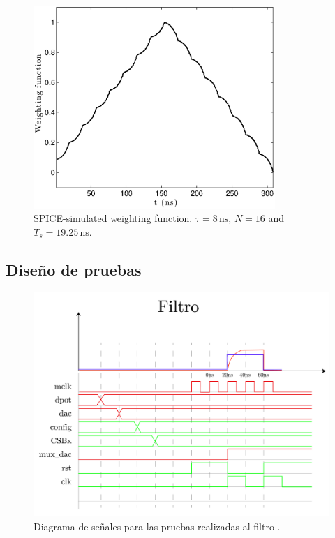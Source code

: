 \begin{figure}[!t]
	\centering
	\includegraphics[width=3.6in]{./figures/theorical/sim_wf}
	\caption{SPICE-simulated weighting function. $\tau=8\,\text{ns}$, $N=16$ and $T_s=19.25\,\text{ns}$.}\label{fig:sim_wf}
\end{figure}

\subsection{Diseño de pruebas}

\begin{figure}[!t]
	\centering
	\includegraphics[width=1\textwidth]{./figures/theorical/tiempos_filtro.png}
	\caption{Diagrama de señales para las pruebas realizadas al filtro .}\label{fig:diagramafiltro}
\end{figure}

